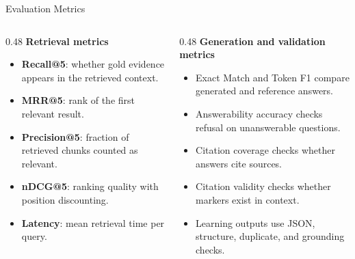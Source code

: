 \documentclass[10pt,aspectratio=169]{beamer}
\newcommand{\key}[1]{\textbf{\textcolor{FreshTeal}{#1}}}
\begin{document}
\begin{frame}{Evaluation Metrics}
    \begin{columns}[T,totalwidth=\textwidth]
        \begin{column}{0.48\textwidth}
            \textbf{Retrieval metrics}
            \begin{itemize}
                \item \key{Recall@5}: whether gold evidence appears in the retrieved context.
                \item \key{MRR@5}: rank of the first relevant result.
                \item \key{Precision@5}: fraction of retrieved chunks counted as relevant.
                \item \key{nDCG@5}: ranking quality with position discounting.
                \item \key{Latency}: mean retrieval time per query.
            \end{itemize}
        \end{column}
        \begin{column}{0.48\textwidth}
            \textbf{Generation and validation metrics}
            \begin{itemize}
                \item Exact Match and Token F1 compare generated and reference answers.
                \item Answerability accuracy checks refusal on unanswerable questions.
                \item Citation coverage checks whether answers cite sources.
                \item Citation validity checks whether markers exist in context.
                \item Learning outputs use JSON, structure, duplicate, and grounding checks.
            \end{itemize}
        \end{column}
    \end{columns}
\end{frame}
\end{document}
